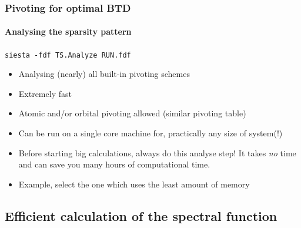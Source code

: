 \begin{frame}
  \frametitle{Pivoting for optimal BTD}
  \framesubtitle{Analysing the sparsity pattern}

  \begin{center}
    \texttt{siesta -fdf TS.Analyze RUN.fdf}
  \end{center}

  \begin{itemize}[<+->]
    \item Analysing (nearly) all built-in pivoting schemes

    \item Extremely fast

    \item Atomic and/or orbital pivoting allowed (similar pivoting table)

    \item Can be run on a single core machine for, practically any size of system(!)

    \item Before starting big calculations, always do this analyse step! It takes
    \emph{no} time and can save you many hours of computational time.

    \item Example, select the one which uses the least amount of memory

  \end{itemize}

\end{frame}


\subsection{Efficient calculation of the spectral function}

